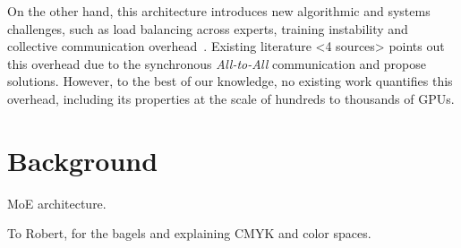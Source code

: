 \documentclass[acmsmall,screen,review,anonymous]{acmart}
\begin{document}
On the other hand, this architecture introduces new algorithmic and systems challenges,
such as load balancing across experts, training instability and
collective communication overhead~\cite{ShazeerMMDLHD17, zoph2022stmoe}.
Existing literature <4 sources> points out this overhead due to the synchronous \emph{All-to-All} communication
and propose solutions.
However, to the best of our knowledge, no existing work quantifies this overhead,
including its properties at the scale of hundreds to thousands of GPUs.


\section{Background}\label{sec:background}
MoE architecture.

\begin{acks}
To Robert, for the bagels and explaining CMYK and color spaces.
\end{acks}




\appendix
\end{document}
